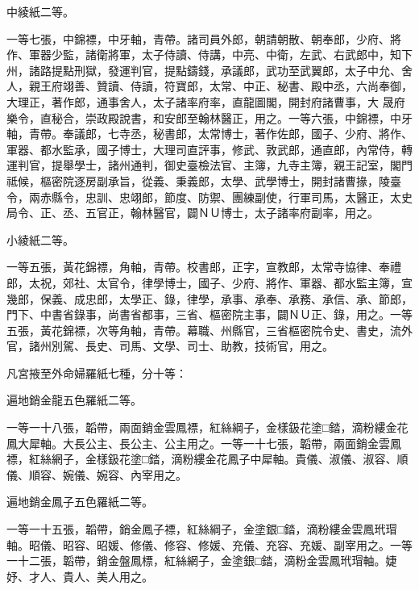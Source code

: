 \begin{pinyinscope}
 中綾紙二等。



 一等七張，中錦褾，中牙軸，青帶。諸司員外郎，朝請朝散、朝奉郎，少府、將作、軍器少監，諸衛將軍，太子侍讀、侍講，中亮、中衛，左武、右武郎中，知下州，諸路提點刑獄，發運判官，提點鑄錢，承議郎，武功至武翼郎，太子中允、舍人，親王府翊善、贊讀、侍讀，符寶郎，太常、中正、秘書、殿中丞，六尚奉御，大理正，著作郎，通事舍人，太子諸率府率，直龍圖閣，開封府諸曹事，大
 晟府樂令，直秘合，崇政殿說書，和安郎至翰林醫正，用之。一等六張，中錦褾，中牙軸，青帶。奉議郎，七寺丞，秘書郎，太常博士，著作佐郎，國子、少府、將作、軍器、都水監承，國子博士，大理司直評事，修武、敦武郎，通直郎，內常侍，轉運判官，提舉學士，諸州通判，御史臺檢法官、主簿，九寺主簿，親王記室，閣門祗候，樞密院逐房副承旨，從義、秉義郎，太學、武學博士，開封諸曹掾，陵臺令，兩赤縣令，忠訓、忠翊郎，節度、防禦、團練副使，行軍司馬，太醫正，太史局令、正、丞、五官正，翰林醫官，闢ＮＵ博士，太子諸率府副率，用之。



 小綾紙二等。



 一等五張，黃花錦褾，角軸，青帶。校書郎，正字，宣教郎，太常寺協律、奉禮郎，太祝，郊社、太官令，律學博士，國子、少府、將作、軍器、都水監主簿，宣幾郎，保義、成忠郎，太學正、錄，律學，承事、承奉、承務、承信、承、節郎，門下、中書省錄事，尚書省都事，三省、樞密院主事，闢ＮＵ正、錄，用之。一等五張，黃花錦褾，次等角軸，青帶。幕職、州縣官，三省樞密院令史、書史，流外
 官，諸州別駕、長史、司馬、文學、司士、助教，技術官，用之。



 凡宮掖至外命婦羅紙七種，分十等：



 遍地銷金龍五色羅紙二等。



 一等一十八張，韜帶，兩面銷金雲鳳褾，紅絲綱子，金樣鈒花塗□錔，滴粉縷金花鳳大犀軸。大長公主、長公主、公主用之。一等一十七張，韜帶，兩面銷金雲鳳褾，紅絲網子，金樣鈒花塗□錔，滴粉縷金花鳳子中犀軸。貴儀、淑儀、淑容、順儀、順容、婉儀、婉容、內宰用之。



 遍地銷金鳳子五色羅紙二等。



 一等一十五張，韜帶，銷金鳳子褾，紅絲綱子，金塗銀□錔，滴粉縷金雲鳳玳瑁軸。昭儀、昭容、昭媛、修儀、修容、修媛、充儀、充容、充媛、副宰用之。一等一十二張，韜帶，銷金盤鳳標，紅絲網子，金塗銀□錔，滴粉金雲鳳玳瑁軸。婕妤、才人、貴人、美人用之。




\end{pinyinscope}
